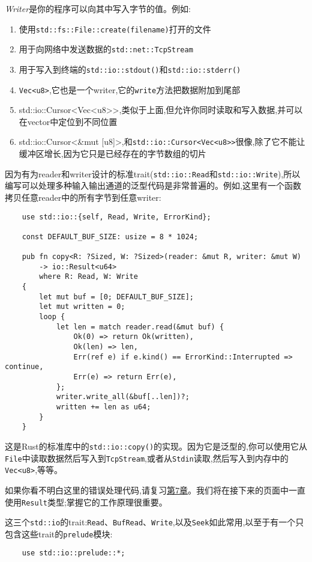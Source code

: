 \emph{Writer}是你的程序可以向其中写入字节的值。例如:
\begin{enumerate}
    \item 使用\texttt{std::fs::File::create(filename)}打开的文件
    \item 用于向网络中发送数据的\texttt{std::net::TcpStream}
    \item 用于写入到终端的\texttt{std::io::stdout()}和\texttt{std::io::stderr()}
    \item \texttt{Vec<u8>},它也是一个writer,它的\texttt{write}方法把数据附加到尾部
    \item std::io::Cursor<Vec<u8>>,类似于上面,但允许你同时读取和写入数据,并可以在vector中定位到不同位置
    \item std::io::Cursor<\&mut [u8]>,和\texttt{std::io::Cursor<Vec<u8>>}很像,除了它不能让缓冲区增长,因为它只是已经存在的字节数组的切片
\end{enumerate}

因为有为reader和writer设计的标准trait(\texttt{std::io::Read}和\texttt{std::io::Write}),所以编写可以处理多种输入输出通道的泛型代码是非常普遍的。例如,这里有一个函数拷贝任意reader中的所有字节到任意writer:
\begin{verbatim}
    use std::io::{self, Read, Write, ErrorKind};

    const DEFAULT_BUF_SIZE: usize = 8 * 1024;

    pub fn copy<R: ?Sized, W: ?Sized>(reader: &mut R, writer: &mut W)
        -> io::Result<u64>
        where R: Read, W: Write
    {
        let mut buf = [0; DEFAULT_BUF_SIZE];
        let mut written = 0;
        loop {
            let len = match reader.read(&mut buf) {
                Ok(0) => return Ok(written),
                Ok(len) => len,
                Err(ref e) if e.kind() == ErrorKind::Interrupted => continue,
                Err(e) => return Err(e),
            };
            writer.write_all(&buf[..len])?;
            written += len as u64;
        }
    }
\end{verbatim}

这是Rust的标准库中的\texttt{std::io::copy()}的实现。因为它是泛型的,你可以使用它从\texttt{File}中读取数据然后写入到\texttt{TcpStream},或者从\texttt{Stdin}读取,然后写入到内存中的\texttt{Vec<u8>},等等。

如果你看不明白这里的错误处理代码,请复习\hyperref[ch07]{第7章}。我们将在接下来的页面中一直使用\texttt{Result}类型;掌握它的工作原理很重要。

这三个\texttt{std::io}的trait:\texttt{Read}、\texttt{BufRead}、\texttt{Write},以及\texttt{Seek}如此常用,以至于有一个只包含这些trait的\texttt{prelude}模块:
\begin{verbatim}
    use std::io::prelude::*;
\end{verbatim}

